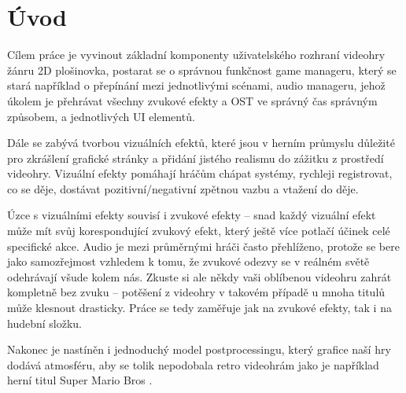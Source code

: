 \chapter{Úvod}

Cílem práce je vyvinout základní komponenty uživatelského rozhraní videohry žánru 2D plošinovka, postarat se o správnou funkčnost game manageru, který se stará například o přepínání mezi jednotlivými scénami, audio manageru, jehož úkolem je přehrávat všechny zvukové efekty a OST ve správný čas správným způsobem, a jednotlivých UI elementů.

Dále se zabývá tvorbou vizuálních efektů, které jsou v herním průmyslu důležité pro zkrášlení grafické stránky a přidání jistého realismu do zážitku z prostředí videohry. Vizuální efekty pomáhají hráčům chápat systémy, rychleji registrovat, co se děje, dostávat pozitivní/negativní zpětnou vazbu a vtažení do děje.

Úzce s vizuálními efekty souvisí i zvukové efekty -- snad každý vizuální efekt může mít svůj korespondující zvukový efekt, který ještě více potlačí účinek celé specifické akce. Audio je mezi průměrnými hráči často přehlíženo, protože se bere jako samozřejmost vzhledem k tomu, že zvukové odezvy se v reálném světě odehrávají všude kolem nás. Zkuste si ale někdy vaši oblíbenou videohru zahrát kompletně bez zvuku -- potěšení z videohry v takovém případě u mnoha titulů může klesnout drasticky. Práce se tedy zaměřuje jak na zvukové efekty, tak i na hudební složku.

Nakonec je nastíněn i jednoduchý model postprocessingu, který grafice naší hry dodává atmosféru, aby se tolik nepodobala retro videohrám jako je například herní titul Super Mario Bros \cite{super-mario-bros}.